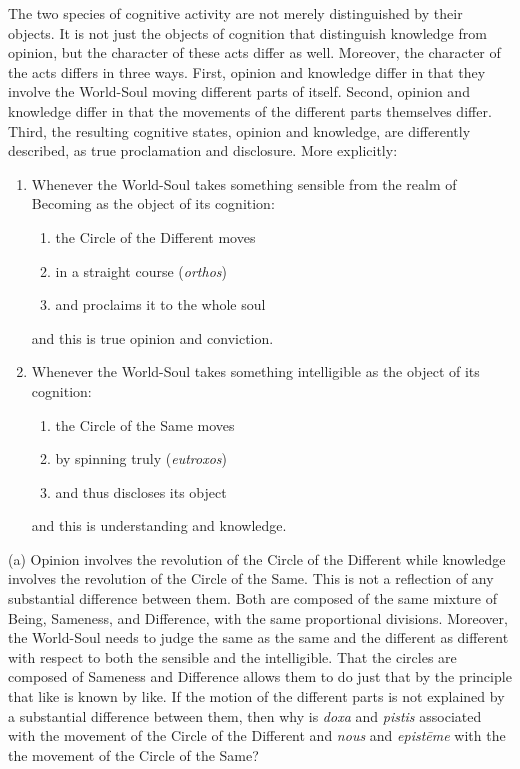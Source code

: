 The two species of cognitive activity are not merely distinguished by their objects. It is not just the objects of cognition that distinguish knowledge from opinion, but the character of these acts differ as well. Moreover, the character of the acts differs in three ways. First, opinion and knowledge differ in that they involve the World-Soul moving different parts of itself. Second, opinion and knowledge differ in that the movements of the different parts themselves differ. Third, the resulting cognitive states, opinion and knowledge, are differently described, as true proclamation and disclosure. More explicitly:
\begin{enumerate}[(1)]
	\item Whenever the World-Soul takes something sensible from the realm of Becoming as the object of its cognition:
	\begin{enumerate}
		\item the Circle of the Different moves
		\item in a straight course (\emph{orthos})
		\item and proclaims it to the whole soul
	\end{enumerate}
and this is true opinion and conviction.
	\item Whenever the World-Soul takes something intelligible as the object of its cognition:
	\begin{enumerate}
		\item the Circle of the Same moves
		\item by spinning truly (\emph{eutroxos})
		\item and thus discloses its object
	\end{enumerate}
and this is understanding and knowledge.
\end{enumerate}

(a) Opinion involves the revolution of the Circle of the Different while knowledge involves the revolution of the Circle of the Same. This is not a reflection of any substantial difference between them. Both are composed of the same mixture of Being, Sameness, and Difference, with the same proportional divisions. Moreover, the World-Soul needs to judge the same as the same and the different as different with respect to both the sensible and the intelligible. That the circles are composed of Sameness and Difference allows them to do just that by the principle that like is known by like. If the motion of the different parts is not explained by a substantial difference between them, then why is \emph{doxa} and \emph{pistis} associated with the movement of the Circle of the Different and \emph{nous} and \emph{epistēme} with the the movement of the Circle of the Same?

